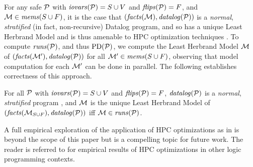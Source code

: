 For any safe $\mathcal{P}$ with $\mathit{iovars}(\mathcal{P}) = S \cup V$ and $\mathit{flips}(\mathcal{P}) = F$, and
$\mathcal{M} \in \mathit{mems}(S \cup F)$, it is the case
that $(\mathit{facts}(\mathcal{M}),\mathit{datalog}(\mathcal{P}))$ is a \emph{normal}, \emph{stratified}
(in fact, non-recursive) Datalog program, and so has a unique Least Herbrand Model
and is thus amenable to HPC optimization techniques \cite{aspis2018linear}. 
To compute $\mathit{runs}(\mathcal{P})$, and thus $\mathrm{PD}(\mathcal{P})$, we compute
the Least Herbrand Model $\mathcal{M}$ of $(\mathit{facts}(\mathcal{M}'),\mathit{datalog}(\mathcal{P}))$
for all $\mathcal{M}' \in \mathit{mems}(S \cup F)$, observing that model computation for
each $\mathcal{M}'$ can be done in parallel. The following establishes
correctness of this approach.
\begin{lemma}
  For all $\mathcal{P}$ with $\mathit{iovars}(\mathcal{P}) = S \cup V$ and $\mathit{flips}(\mathcal{P}) = F$,
  $\mathit{datalog}(\mathcal{P})$ is a \emph{normal}, \emph{stratified}
  program \cite{aspis2018linear}, and $\mathcal{M}$ is the unique Least Herbrand
  Model of $(\mathit{facts}(\mathcal{M}_{S \cup F}),\mathit{datalog}(\mathcal{P}))$
  iff $\mathcal{M} \in \mathit{runs}(\mathcal{P})$.
\end{lemma}
A full empirical exploration of the application of HPC optimizations
as in \cite{XXX} is beyond the scope of this paper but is a compelling
topic for future work. The reader is referred to \cite{XXX} for empirical
results of HPC optimizations in other logic programming contexts. 
